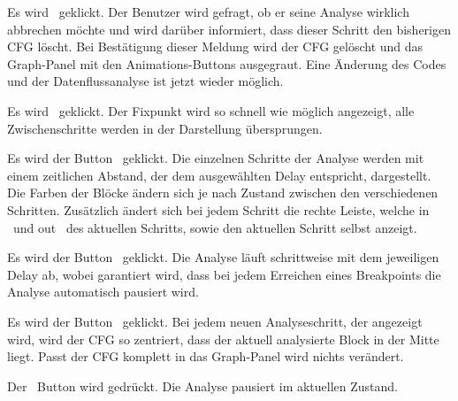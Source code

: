 {Es wird \faStop\ geklickt.}
{Der Benutzer wird gefragt, ob er seine Analyse wirklich abbrechen möchte und wird darüber informiert, dass dieser Schritt den bisherigen CFG löscht. Bei Bestätigung dieser Meldung wird der CFG gelöscht und das Graph-Panel mit den Animations-Buttons ausgegraut. Eine Änderung des Codes und der Datenflussanalyse ist jetzt wieder möglich.}



{Es wird \faPlay\ geklickt.}
{Der Fixpunkt wird so schnell wie möglich angezeigt, alle Zwischenschritte werden in der Darstellung übersprungen.}

{Es wird der Button \faPlay\ geklickt.}
{Die einzelnen Schritte der Analyse werden mit einem zeitlichen Abstand, der dem ausgewählten Delay entspricht, dargestellt. Die Farben der Blöcke ändern sich je nach Zustand zwischen den verschiedenen Schritten. Zusätzlich ändert sich bei jedem Schritt die rechte Leiste, welche \glqq in \grqq\ und \glqq out \grqq\ des aktuellen Schritts, sowie den aktuellen Schritt selbst anzeigt.}

{Es wird der Button \faPlay\ geklickt.}
{Die Analyse läuft schrittweise mit dem jeweiligen Delay ab, wobei garantiert wird, dass bei jedem Erreichen eines Breakpoints die Analyse automatisch pausiert wird.}

{Es wird der Button \faPlay\ geklickt.}
{Bei jedem neuen Analyseschritt, der angezeigt wird, wird der CFG so zentriert, dass der aktuell analysierte Block in der Mitte liegt. Passt der CFG komplett in das Graph-Panel wird nichts verändert.}




{Der \faPause\ Button wird gedrückt.}
{Die Analyse pausiert im aktuellen Zustand.}

